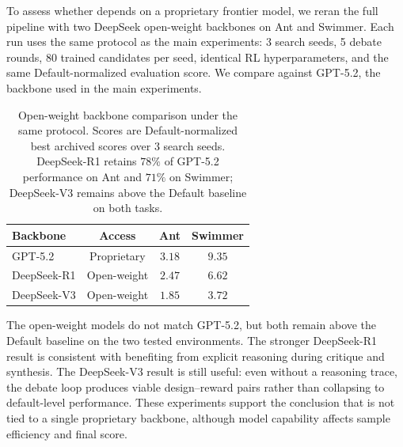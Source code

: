 To assess whether \abbrev{} depends on a proprietary frontier model, we reran the full pipeline with two DeepSeek open-weight backbones on Ant and Swimmer. Each run uses the same protocol as the main experiments: 3 search seeds, 5 debate rounds, 80 trained candidates per seed, identical RL hyperparameters, and the same Default-normalized evaluation score. We compare against GPT-5.2, the backbone used in the main experiments.

\begin{table}[H]
\centering
\caption{Open-weight backbone comparison under the same \abbrev{} protocol. Scores are Default-normalized best archived scores over 3 search seeds. DeepSeek-R1 retains $78\%$ of GPT-5.2 performance on Ant and $71\%$ on Swimmer; DeepSeek-V3 remains above the Default baseline on both tasks.}
\label{tab:open_weight_backbones}
\small
\setlength{\tabcolsep}{5pt}
\begin{tabular}{lccc}
\toprule
\textbf{Backbone} & \textbf{Access} & \textbf{Ant} & \textbf{Swimmer} \\
\midrule
GPT-5.2 & Proprietary & $3.18$ & $9.35$ \\
DeepSeek-R1 & Open-weight & $2.47$ & $6.62$ \\
DeepSeek-V3 & Open-weight & $1.85$ & $3.72$ \\
\bottomrule
\end{tabular}
\end{table}

The open-weight models do not match GPT-5.2, but both remain above the Default baseline on the two tested environments. The stronger DeepSeek-R1 result is consistent with \abbrev{} benefiting from explicit reasoning during critique and synthesis. The DeepSeek-V3 result is still useful: even without a reasoning trace, the debate loop produces viable design--reward pairs rather than collapsing to default-level performance. These experiments support the conclusion that \abbrev{} is not tied to a single proprietary backbone, although model capability affects sample efficiency and final score.
